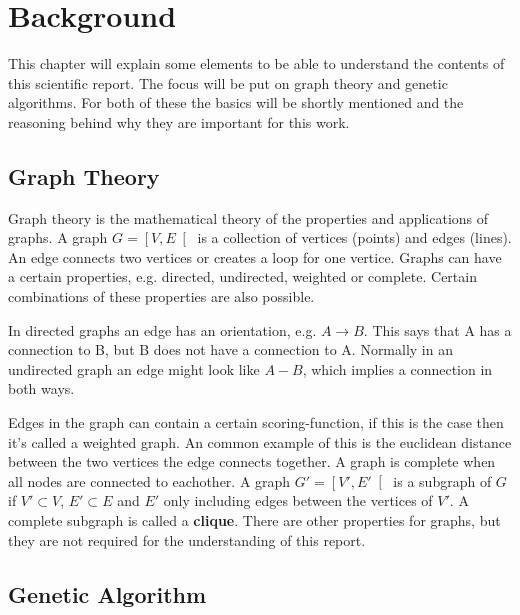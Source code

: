 \section{Background}
\label{chapter:background}
This chapter will explain some elements to be able to understand the contents of this scientific report.
The focus will be put on graph theory and genetic algorithms.
For both of these the basics will be shortly mentioned and the reasoning behind why they are important for this work.

\subsection{Graph Theory}
Graph theory is the mathematical theory of the properties and applications of graphs.
A graph $G=\left[V,E\right[$ is a collection of vertices (points) and edges (lines).
An edge connects two vertices or creates a loop for one vertice.
Graphs can have a certain properties, e.g. directed, undirected, weighted or complete.
Certain combinations of these properties are also possible.

In directed graphs an edge has an orientation, e.g. $A \rightarrow B$. This says that A has a connection to B, but B does not have a connection to A.
Normally in an undirected graph an edge might look like $A - B$, which implies a connection in both ways.

Edges in the graph can contain a certain scoring-function, if this is the case then it's called a weighted graph.
An common example of this is the euclidean distance between the two vertices the edge connects together.
A graph is complete when all nodes are connected to eachother.
A graph $G'=\left[V',E'\right[$ is a subgraph of $G$ if $V' \subset V$, $E' \subset E$ and $E'$ only including edges between the vertices of $V'$.
A complete subgraph is called a \textbf{clique}.
There are other properties for graphs, but they are not required for the understanding of this report.

\subsection{Genetic Algorithm}
